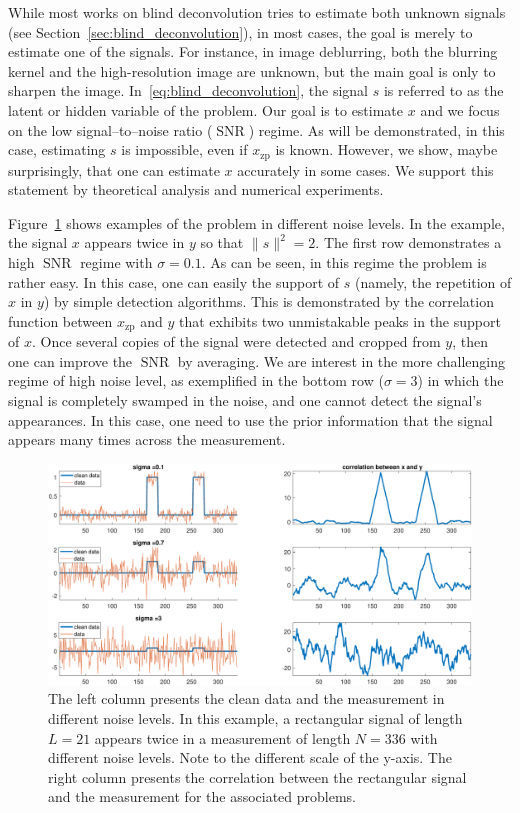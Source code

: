 \documentclass[journal]{IEEEtran}
\numberwithin{equation}{section}
\numberwithin{figure}{section}
\theoremstyle{plain}
\theoremstyle{definition}
\theoremstyle{remark}
\theoremstyle{plain}
\theoremstyle{remark}
\theoremstyle{plain}
\theoremstyle{plain}
\newcommand{\xz}{x_{\textrm{zp}}}
\newcommand{\SNR}{\operatorname{SNR}}
\begin{document}
While most works on blind deconvolution tries to estimate both unknown signals (see Section~\ref{sec:blind_deconvolution}), in most cases, the goal is merely to estimate one of the signals.
For instance, in image deblurring, both the blurring kernel and the high-resolution image are unknown, but the main goal is only to sharpen the image. In~\eqref{eq:blind_deconvolution}, the signal $s$ is referred to as the latent or hidden variable of the problem. Our goal is to estimate  $x$ and we focus  on the low signal--to--noise ratio ($\SNR$) regime. As will be demonstrated, in this case, estimating $s$ is impossible, even if $\xz$ is known. However, we show, maybe surprisingly, that one can estimate $x$ accurately in some cases.  We support this statement by theoretical analysis and numerical  experiments.

Figure~\ref{fig:example} shows examples of the problem in different noise levels. In the example, the signal $x$ appears twice in $y$ so that $\| s \|^2 = 2$. The first row demonstrates a high $\SNR$ regime with $\sigma = 0.1$. As can be seen, in this regime  the problem is rather easy. In this case, one can easily the support of $s$ (namely, the repetition of $x$ in $y$) by simple detection algorithms. This is demonstrated by the correlation function between $\xz$ and $y$ that exhibits two unmistakable peaks in the support of $x$.  Once several copies of the signal were detected and cropped from $y$, then one can  improve the $\SNR$ by averaging. We are interest in the more challenging regime of high noise level, as exemplified in the bottom row ($\sigma  = 3$)
in which the signal is completely swamped in the noise, and one cannot detect the signal's appearances. In this case, one need to use the prior information that the signal appears many times across the measurement.

\begin{figure}
	\begin{center}
	\includegraphics[scale = .5]{example}
	\end{center}
\caption{The left column presents the clean data and the measurement in different noise levels. In this example, a rectangular signal of length $L=21$ appears twice in a measurement of length $N=336$ with different noise levels. Note to the different scale of the y-axis. The right column presents the correlation between the rectangular signal and the measurement for the associated problems. }
\label{fig:example}
\end{figure}
\end{document}

